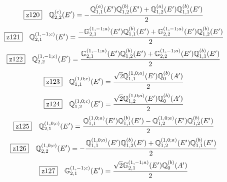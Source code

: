 \documentclass[fleqn,10pt,landscape]{jsarticle}
\begin{document}
\begin{dmath*}
\hspace*{3mm}\fbox{z120}\quad \mathbb{Q}_{2,2}^{(c)}(E^{\prime})=- \frac{\mathbb{Q}_{1,1}^{(a)}(E^{\prime}) \mathbb{Q}_{1,2}^{(b)}(E^{\prime}) + \mathbb{Q}_{1,2}^{(a)}(E^{\prime}) \mathbb{Q}_{1,1}^{(b)}(E^{\prime})}{2}
\end{dmath*}
\begin{dmath*}
\hspace*{3mm}\fbox{z121}\quad \mathbb{Q}_{2,1}^{(1,-1;c)}(E^{\prime})=\frac{- \mathbb{G}_{2,1}^{(1,-1;a)}(E^{\prime}) \mathbb{Q}_{1,1}^{(b)}(E^{\prime}) + \mathbb{G}_{2,2}^{(1,-1;a)}(E^{\prime}) \mathbb{Q}_{1,2}^{(b)}(E^{\prime})}{2}
\end{dmath*}
\begin{dmath*}
\hspace*{3mm}\fbox{z122}\quad \mathbb{Q}_{2,2}^{(1,-1;c)}(E^{\prime})=\frac{\mathbb{G}_{2,1}^{(1,-1;a)}(E^{\prime}) \mathbb{Q}_{1,2}^{(b)}(E^{\prime}) + \mathbb{G}_{2,2}^{(1,-1;a)}(E^{\prime}) \mathbb{Q}_{1,1}^{(b)}(E^{\prime})}{2}
\end{dmath*}
\begin{dmath*}
\hspace*{3mm}\fbox{z123}\quad \mathbb{Q}_{1,1}^{(1,0;c)}(E^{\prime})=\frac{\sqrt{2} \mathbb{Q}_{1,1}^{(1,0;a)}(E^{\prime}) \mathbb{Q}_{0}^{(b)}(A^{\prime})}{2}
\end{dmath*}
\begin{dmath*}
\hspace*{3mm}\fbox{z124}\quad \mathbb{Q}_{1,2}^{(1,0;c)}(E^{\prime})=\frac{\sqrt{2} \mathbb{Q}_{1,2}^{(1,0;a)}(E^{\prime}) \mathbb{Q}_{0}^{(b)}(A^{\prime})}{2}
\end{dmath*}
\begin{dmath*}
\hspace*{3mm}\fbox{z125}\quad \mathbb{Q}_{2,1}^{(1,0;c)}(E^{\prime})=\frac{\mathbb{Q}_{1,1}^{(1,0;a)}(E^{\prime}) \mathbb{Q}_{1,1}^{(b)}(E^{\prime}) - \mathbb{Q}_{1,2}^{(1,0;a)}(E^{\prime}) \mathbb{Q}_{1,2}^{(b)}(E^{\prime})}{2}
\end{dmath*}
\begin{dmath*}
\hspace*{3mm}\fbox{z126}\quad \mathbb{Q}_{2,2}^{(1,0;c)}(E^{\prime})=- \frac{\mathbb{Q}_{1,1}^{(1,0;a)}(E^{\prime}) \mathbb{Q}_{1,2}^{(b)}(E^{\prime}) + \mathbb{Q}_{1,2}^{(1,0;a)}(E^{\prime}) \mathbb{Q}_{1,1}^{(b)}(E^{\prime})}{2}
\end{dmath*}
\begin{dmath*}
\hspace*{3mm}\fbox{z127}\quad \mathbb{G}_{2,1}^{(1,-1;c)}(E^{\prime})=\frac{\sqrt{2} \mathbb{G}_{2,1}^{(1,-1;a)}(E^{\prime}) \mathbb{Q}_{0}^{(b)}(A^{\prime})}{2}
\end{dmath*}
\end{document}
